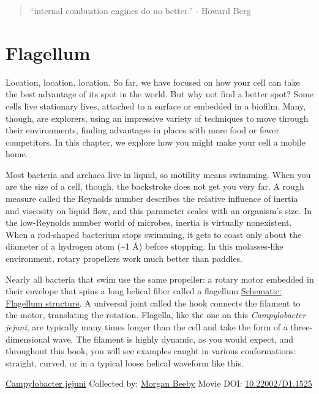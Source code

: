 \documentclass[]{tufte-book}
\begin{document}
\begin{quote}
``internal combustion engines do no better.''
- Howard Berg \citep{berg1988}
\end{quote}

\hypertarget{flagellum}{%
\section{Flagellum}\label{flagellum}}

Location, location, location. So far, we have focused on how your cell can take the best advantage of its spot in the world. But why not find a better spot? Some cells live stationary lives, attached to a surface or embedded in a biofilm. Many, though, are explorers, using an impressive variety of techniques to move through their environments, finding advantages in places with more food or fewer competitors. In this chapter, we explore how you might make your cell a mobile home.

Most bacteria and archaea live in liquid, so motility means swimming. When you are the size of a cell, though, the backstroke does not get you very far. A rough measure called the Reynolds number describes the relative influence of inertia and viscosity on liquid flow, and this parameter scales with an organism's size. In the low-Reynolds number world of microbes, inertia is virtually nonexistent. When a rod-shaped bacterium stops swimming, it gets to coast only about the diameter of a hydrogen atom (\textasciitilde{}1 Å) before stopping. In this molasses-like environment, rotary propellers work much better than paddles.

Nearly all bacteria that swim use the same propeller: a rotary motor embedded in their envelope that spins a long helical fiber called a flagellum \protect\hyperlink{Flagellum_structure}{Schematic: Flagellum structure}. A universal joint called the hook connects the filament to the motor, translating the rotation. Flagella, like the one on this \emph{Campylobacter jejuni}, are typically many times longer than the cell and take the form of a three-dimensional wave. The filament is highly dynamic, as you would expect, and throughout this book, you will see examples caught in various conformations: straight, curved, or in a typical loose helical waveform like this.



\hypertarget{htmlwidget-bb26eef1c849db14aeee}{}

\label{fig:6-1}\protect\hyperlink{tree}{Campylobacter jejuni} Collected by: \protect\hyperlink{morgan_beeby}{Morgan Beeby} Movie DOI: \href{https://doi.org/10.22002/D1.1525}{10.22002/D1.1525}
\end{document}
